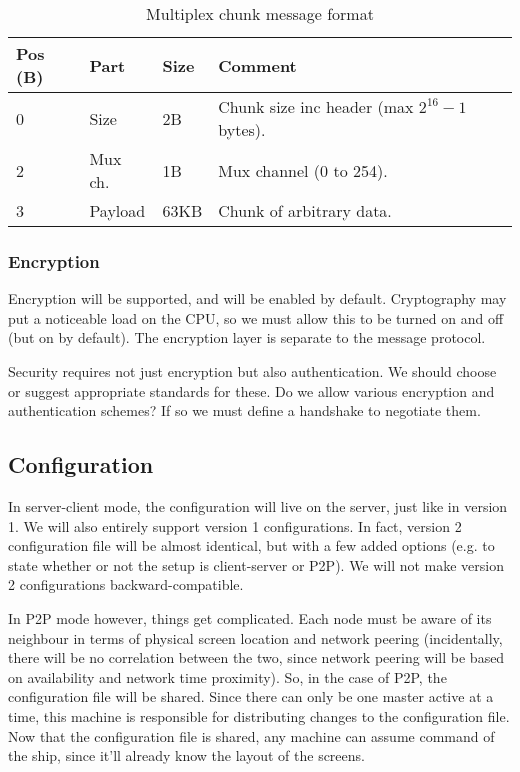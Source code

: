 \begin{table}[ht!]
  \begin{tabular}{|l|l|l|l|l|}
    \hline
    \textbf{Pos (B)} &
    \textbf{Part} &
    \textbf{Size} &
    \textbf{Comment} \\
    \hline
    0 & Size & 2B & Chunk size inc header (max $2^{16}-1$ bytes). \\
    2 & Mux ch. & 1B & Mux channel (0 to 254). \\
    3 & Payload & 63KB & Chunk of arbitrary data. \\
    \hline
  \end{tabular}
  \caption{Multiplex chunk message format}
  \label{tab:muxChunkMessage}
\end{table}

\subsubsection{Encryption}

Encryption will be supported, and will be enabled by default. Cryptography may 
put a noticeable load on the CPU, so we must allow this to be turned on and off
(but on by default). The encryption layer is separate to the message protocol.

Security requires not just encryption but also authentication. We should choose
or suggest appropriate standards for these. Do we allow various encryption and
authentication schemes? If so we must define a handshake to negotiate them.


\subsection{Configuration}

In server-client mode, the configuration will live on the server, just like in
version 1. We will also entirely support version 1 configurations. In fact, 
version 2 configuration file will be almost identical, but with a few added
options (e.g. to state whether or not the setup is client-server or P2P). We 
will not make version 2 configurations backward-compatible.

In P2P mode however, things get complicated. Each node must be aware of its
neighbour in terms of physical screen location and network peering
(incidentally, there will be no correlation between the two, since network 
peering will be based on availability and network time proximity). So, in the
case of P2P, the configuration file will be shared. Since there can only be
one master active at a time, this machine is responsible for distributing
changes to the configuration file. Now that the configuration file is shared,
any machine can assume command of the ship, since it'll already know the layout
of the screens.

